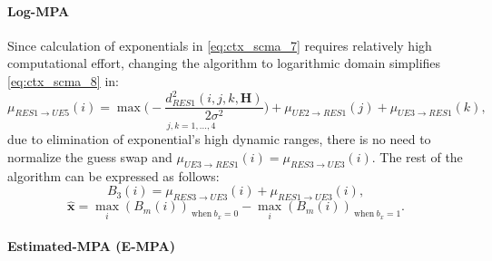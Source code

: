 \paragraph{Log-MPA}
\label{sec:ctx_scma_log-map}

Since calculation of exponentials in \eqref{eq:ctx_scma_7} requires relatively
high computational effort, changing the algorithm to logarithmic domain
simplifies \eqref{eq:ctx_scma_8} in:
\begin{equation}
  \label{eq:ctx_scma_13}
  \mu_{RES1 \rightarrow UE5}(i) = \underset{j,k=1,...,4}
  {\max \Bigg(-\frac{d_{RES1}^2(i,j,k,\bm{H})}{2\sigma^2} \Bigg)} +
  \mu_{UE2 \rightarrow RES1}(j) + \mu_{UE3 \rightarrow RES1}(k),
\end{equation}
due to elimination of exponential's high dynamic ranges, there is no need to
normalize the guess swap and $\mu_{UE3 \rightarrow RES1}(i) =
\mu_{RES3 \rightarrow UE3}(i).$ The rest of the algorithm can be expressed as
follows:
\begin{equation}
  \label{eq:ctx_scma_15}
  B_3(i) = \mu_{RES3 \rightarrow UE3}(i) + \mu_{RES1 \rightarrow UE3}(i),
\end{equation}
\begin{equation}
  \label{eq:ctx_scma_16}
  \bm{\hat{x}} = \max_i(B_m(i))_{~\text{when}~b_x=0} - \max_i(B_m(i))_{~\text{when}~b_x=1}.
\end{equation}

\paragraph{Estimated-MPA (E-MPA)}

